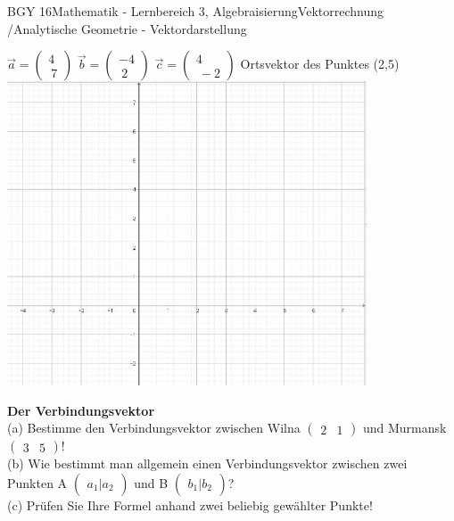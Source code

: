 \documentclass[oneside,openany,headings=optiontotoc,11pt,numbers=noenddot]{scrreprt}
\begin{document}
\begin{worksheet}{BGY 16}{Mathematik - Lernbereich 3, Algebraisierung}{Vektorrechnung /Analytische Geometrie - Vektordarstellung}
\begin{framed}
			\par
			\( \overrightarrow{a} = \begin{pmatrix} 4 \\\ 7\end{pmatrix}\) \hfill \(\overrightarrow{b} = \begin{pmatrix}-4 \\\ 2 \end{pmatrix}\) \hfill \( \overrightarrow{c} = \begin{pmatrix}4 \\\ -2\end{pmatrix}\) \hfill Ortsvektor des Punktes (2,5)\\
			\includegraphics[width=0.8\textwidth]{Koord.jpg}
		\end{framed}
		\begin{framed}
			\noindent
			\textbf{Der Verbindungsvektor}\\
			(a) Bestimme den Verbindungsvektor zwischen Wilna \(\begin{pmatrix}
				2 & 1
			\end{pmatrix}\) und Murmansk \(\begin{pmatrix}
			3 & 5
			\end{pmatrix}\)!\\
			(b) Wie bestimmt man allgemein einen Verbindungsvektor zwischen zwei Punkten A \(\begin{pmatrix}a_{1} | a_{2}\end{pmatrix}\) und B \(\begin{pmatrix}b_{1}|b_{2}\end{pmatrix}\)?\\
			(c) Prüfen Sie Ihre Formel anhand zwei beliebig gewählter Punkte!\\

\end{framed}
\end{worksheet}
\end{document}
